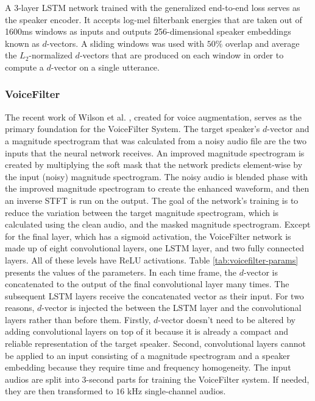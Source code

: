 A 3-layer LSTM network trained with the generalized end-to-end loss serves as the speaker encoder. It accepts log-mel filterbank energies that are taken out of 1600ms windows as inputs and outputs 256-dimensional speaker embeddings known as $d$-vectors. A sliding windows was used with $50\%$ overlap and average the $L_2$-normalized $d$-vectors that are produced on each window in order to compute a $d$-vector on a single utterance.

\subsubsection{VoiceFilter}
The recent work of Wilson et al. \cite{wilson2018}, created for voice augmentation, serves as the primary foundation for the VoiceFilter System. The target speaker's $d$-vector and a magnitude spectrogram that was calculated from a noisy audio file are the two inputs that the neural network receives. An improved magnitude spectrogram is created by multiplying the soft mask that the network predicts element-wise by the input (noisy) magnitude spectrogram. The noisy audio is blended phase with the improved magnitude spectrogram to create the enhanced waveform, and then an inverse STFT is run on the output. The goal of the network's training is to reduce the variation between the target magnitude spectrogram, which is calculated using the clean audio, and the masked magnitude spectrogram. Except for the final layer, which has a sigmoid activation, the VoiceFilter network is made up of eight convolutional layers, one LSTM layer, and two fully connected layers. All of these levels have ReLU activations. Table \ref{tab:voicefilter-params} presents the values of the parameters. In each time frame, the $d$-vector is concatenated to the output of the final convolutional layer many times. The subsequent LSTM layers receive the concatenated vector as their input. For two reasons, $d$-vector is injected the  between the LSTM layer and the convolutional layers rather than before them. Firstly, $d$-vector doesn't need to be altered by adding convolutional layers on top of it because it is already a compact and reliable representation of the target speaker. Second, convolutional layers cannot be applied to an input consisting of a magnitude spectrogram and a speaker embedding because they require time and frequency homogeneity. The input audios are split into 3-second parts for training the VoiceFilter system. If needed, they are then transformed to $16$ kHz single-channel audios.

